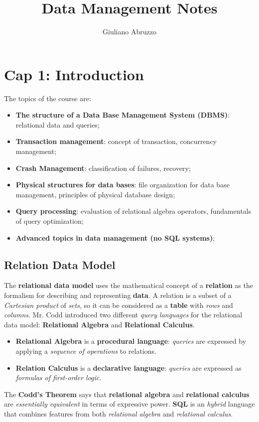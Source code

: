 \documentclass{article}
\author{Giuliano Abruzzo}
\title{Data Management Notes}
\begin{document}
\maketitle
\newpage
\tableofcontents
\newpage
\section{Cap 1: Introduction}
The topics of the course are:
\begin{itemize}
\item \textbf{The structure of a Data Base Management System (DBMS)}: relational data and queries;
\item \textbf{Transaction management}: concept of transaction, concurrency management;
\item \textbf{Crash Management}: classification of failures, recovery;
\item \textbf{Physical structures for data bases}: file organization for data base management, principles of physical database design;
\item \textbf{Query processing}: evaluation of relational algebra operators, fundamentals of query optimization;
\item \textbf{Advanced topics in data management (no SQL systems)};
\end{itemize}
\subsection{Relation Data Model}
The \textbf{relational data model} uses the mathematical concept of a \textbf{relation} as the formalism for describing and representing \textbf{data}. A relation is a subset of a \emph{Cartesian product} of \emph{sets}, so it can be considered as a \textbf{table} with \emph{rows} and \emph{columns}. 
Mr. Codd introduced two different \emph{query languages} for the relational data model: \textbf{Relational Algebra} and \textbf{Relational Calculus}.
\begin{itemize}
\item \textbf{Relational Algebra} is a \textbf{procedural language}: \emph{queries} are expressed by applying a \emph{sequence of operations} to relations.
\item \textbf{Relation Calculus} is a \textbf{declarative language}: \emph{queries} are expressed as \emph{formulas of first-order logic.}
\end{itemize}
The \textbf{Codd's Theorem} says that \textbf{relational algebra} and \textbf{relational calculus} are \emph{essentially equivalent} in terms of expressive power. \textbf{SQL} is an \emph{hybrid} language that combines features from both \emph{relational algebra} and \emph{relational calculus}. 
\end{document}
